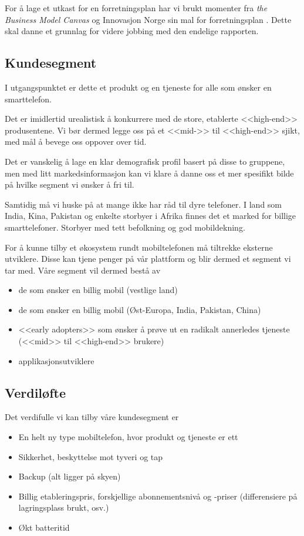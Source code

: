 For å lage et utkast for en forretningsplan har vi brukt momenter fra
\textit{the Business Model Canvas} \cite{osterwalder} og Innovasjon Norge sin
mal for forretningsplan \cite{innovasjon.norge}. Dette skal danne et grunnlag
for videre jobbing med den endelige rapporten.

\subsection{Kundesegment}

I utgangspunktet er dette et produkt og en tjeneste for alle som ønsker en
smarttelefon.

Det er imidlertid urealistisk å konkurrere med de store, etablerte <<high-end>>
produsentene.  Vi bør dermed legge oss på et <<mid->> til <<high-end>> sjikt,
med mål å bevege oss oppover over tid.

Det er vanskelig å lage en klar demografisk profil basert på disse to
gruppene, men med litt markedsinformasjon kan vi klare å danne oss et mer
spesifikt bilde på hvilke segment vi ønsker å fri til.

Samtidig må vi huske på at mange ikke har råd til dyre telefoner. I land som
India, Kina, Pakistan og enkelte storbyer i Afrika finnes det et marked for
billige smarttelefoner. Storbyer med tett befolkning og god mobildekning.

For å kunne tilby et økosystem rundt mobiltelefonen må tiltrekke eksterne
utviklere. Disse kan tjene penger på vår plattform og blir dermed et segment vi
tar med.  Våre segment vil dermed bestå av

\begin{itemize}
  \item de som ønsker en billig mobil (vestlige land)
  \item de som ønsker en billig mobil (Øst-Europa, India, Pakistan, China)
  \item <<early adopters>> som ønsker å prøve ut en radikalt annerledes
    tjeneste (<<mid>> til <<high-end>> brukere)
  \item applikasjonsutviklere
\end{itemize}

\subsection{Verdiløfte}

Det verdifulle vi kan tilby våre kundesegment er

\begin{itemize}
  \item En helt ny type mobiltelefon, hvor produkt og tjeneste er ett
  \item Sikkerhet, beskyttelse mot tyveri og tap
  \item Backup (alt ligger på skyen)
  \item Billig etableringspris, forskjellige abonnementsnivå og
    -priser (differensiere på lagringsplass brukt, osv.)
  \item Økt batteritid
\end{itemize}

